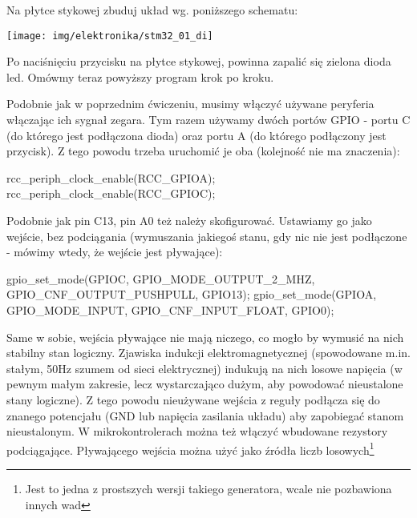 \documentclass{pdfBooklets}
\begin{document}
\inputminted[frame=single,firstline=11]{c}{stm32-examples/01_di/main.c}

Na płytce stykowej zbuduj układ wg. poniższego schematu:

\begin{center}\texttt{[image: img/elektronika/stm32\_01\_di]}\end{center}

Po naciśnięciu przycisku na płytce stykowej, powinna zapalić się zielona dioda led. Omówmy teraz powyższy program krok po kroku.

Podobnie jak w poprzednim ćwiczeniu, musimy włączyć używane peryferia włączając ich sygnał zegara. Tym razem używamy
dwóch portów GPIO - portu C (do którego jest podłączona dioda) oraz portu A (do którego podłączony jest przycisk).
Z tego powodu trzeba uruchomić je oba (kolejność nie ma znaczenia):

\begin{CodeFrame*}[c]{}
  rcc_periph_clock_enable(RCC_GPIOA);
  rcc_periph_clock_enable(RCC_GPIOC);
\end{CodeFrame*}

Podobnie jak pin C13, pin A0 też należy skofigurować\footnotemark. Ustawiamy go jako wejście, bez podciągania
(wymuszania jakiegoś stanu, gdy nic nie jest podłączone - mówimy wtedy, że wejście jest pływające):

\begin{CodeFrame*}[c]{}
  gpio_set_mode(GPIOC, GPIO_MODE_OUTPUT_2_MHZ, GPIO_CNF_OUTPUT_PUSHPULL, GPIO13);
  gpio_set_mode(GPIOA, GPIO_MODE_INPUT, GPIO_CNF_INPUT_FLOAT, GPIO0);
\end{CodeFrame*}


Same w sobie, wejścia pływające nie mają niczego, co mogło by wymusić na nich stabilny stan logiczny. Zjawiska indukcji
elektromagnetycznej (spowodowane m.in. stałym, 50Hz szumem od sieci elektrycznej) indukują na nich losowe napięcia
(w pewnym małym zakresie, lecz wystarczająco dużym, aby powodować nieustalone stany logiczne). Z tego powodu
nieużywane wejścia z reguły podłącza się do znanego potencjału (GND lub napięcia zasilania układu) aby zapobiegać
stanom nieustalonym. W mikrokontrolerach można też włączyć wbudowane rezystory podciągające.
%
Pływającego wejścia można użyć jako źródła liczb losowych\footnote{Jest to jedna z prostszych wersji takiego
  generatora, wcale nie pozbawiona innych wad}
\end{document}
